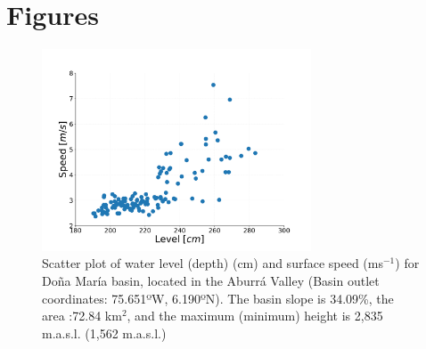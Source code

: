 \documentclass[hess, manuscript]{copernicus}
\begin{document}
\section{Figures}
\setcounter{figure}{0}    
\begin{figure}[t]
\centering
\includegraphics[width = 8cm]{Figures/level_speed_108.pdf}
\caption{Scatter plot of water level (depth) (cm) and surface speed (ms$^{-1}$) for Doña María basin, located in the Aburrá Valley (Basin outlet coordinates: 75.651ºW, 6.190ºN). The basin slope is 34.09\%, the area :72.84 km$^2$, and the maximum (minimum) height is 2,835 m.a.s.l. (1,562 m.a.s.l.)}
\label{fig:Appendix}
\end{figure}

% 




\newpage

%



\end{document}
